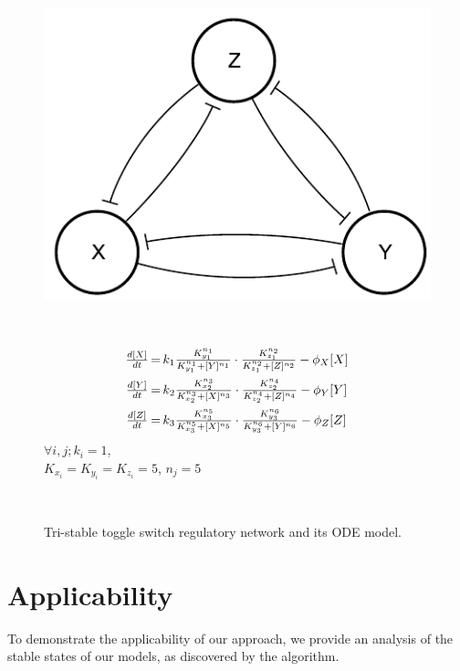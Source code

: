 \begin{figure}
	\begin{center}
		\hspace*{-1cm}  \parbox{5cm}{\includegraphics[scale=.6]{triStableRep.pdf}}~
		\parbox{7cm}{
			$$\begin{array}{c@{$\,=\,$}l}
			\frac{d[X]}{dt} & k_{1} \frac{K_{y_1}^{n_1}}{K_{y_1}^{n_1}+[Y]^{n_1}}\cdot \frac{K_{z_1}^{n_2}}{K_{z_1}^{n_2}+[Z]^{n_2}} - \phi_{X}[X]\\[3mm]
			\frac{d[Y]}{dt} & k_{2} \frac{K_{x_2}^{n_3}}{K_{x_2}^{n_3}+[X]^{n_3}} \cdot \frac{K_{z_2}^{n_4}}{K_{z_2}^{n_4}+[Z]^{n_4}} - \phi_{Y}[Y]\\[3mm]
			\frac{d[Z]}{dt} & k_{3} \frac{K_{x_3}^{n_5}}{K_{x_3}^{n_5}+[X]^{n_5}}\cdot \frac{K_{y_3}^{n_6}}{K_{y_3}^{n_6}+[Y]^{n_6}} - \phi_{Z}[Z]
			\end{array}$$
			\center
			$\forall i,j; k_{i}=1$,\\ $K_{x_i}=K_{y_i}=K_{z_i}=5$, 
			$n_j=5$
		}\\
	\end{center}
	\caption{Tri-stable toggle switch regulatory network and its ODE model.}
	\label{fig:3Drep}
\end{figure}

\section{Applicability}

To demonstrate the applicability of our approach, we provide an analysis of the stable states of our models, as discovered by the algorithm.


